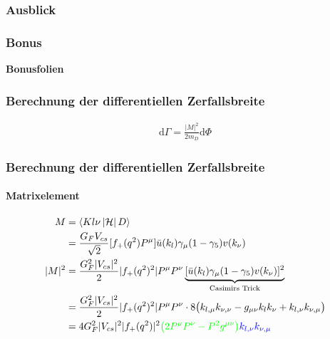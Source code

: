 \documentclass[hyperref={pdfpagelabels=false}]{beamer}
\begin{document}
\begin{frame}
 \frametitle{Ausblick}
 \pause
 \begin{itemize}
  \begin{itemize}
  \end{itemize}
  \begin{itemize}
  \end{itemize} 
 \end{itemize}

\end{frame}



\begin{frame}
\frametitle{Bonus}
\textbf{Bonusfolien}
\end{frame}

 \begin{frame}
  \frametitle{Berechnung der differentiellen Zerfallsbreite}
  \begin{align*}
   \mathrm{d}\Gamma = \frac{|M|^2}{2m_D} \mathrm{d}\Phi
  \end{align*}
 \end{frame}
 
\begin{frame}
  \frametitle{Berechnung der differentiellen Zerfallsbreite}
  \framesubtitle{Matrixelement}
  \begin{align*}
   M &= \langle Kl\nu\,|\mathcal{H}|\,D\rangle\\
   &= \frac{G_F V_{cs}}{\sqrt{2}} [f_+(q^2)P^\mu]\bar u(k_l) \gamma_\mu(1-\gamma_5)v(k_\nu) \\
\vspace{0.7cm}
   |M|^2 &= \frac{G_F^2 |V_{cs}|^2}{2} |f_+(q^2)^2| P^\mu P^\nu \underbrace{[\bar u(k_l)  \gamma_\mu(1-\gamma_5)v(k_\nu) ]^2}_{\text{Casimirs Trick}}\\
   & = \frac{G_F^2 |V_{cs}|^2}{2} |f_+(q^2)^2| P^\mu P^\nu \cdot 8\big(k_{l,\mu} k_{\nu,\nu} - g_{\mu\nu}k_lk_\nu + k_{l,\nu}k_{\nu,\mu}\big)\\
   & = 4G_F^2|V_{cs}|^2 |f_+(q^2)|^2 \color{green}{\big(2P^\mu P^\nu - P^2 g^{\mu\nu}\big)} \color{blue}{k_{l,\nu}k_{\nu,\mu}}
  \end{align*}

\end{frame}
\end{document}
